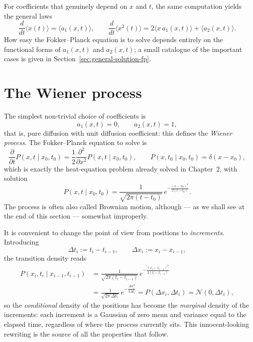 For coefficients that genuinely depend on $x$ and $t$, the same computation yields the general laws
\begin{equation}
\frac{d}{dt}\langle x(t)\rangle = \langle a_1(x,t)\rangle,\qquad
\frac{d}{dt}\langle x^2(t)\rangle = 2\langle x\,a_1(x,t)\rangle + \langle a_2(x,t)\rangle.
\end{equation}
How easy the Fokker--Planck equation is to solve depends entirely on the functional forms of $a_1(x,t)$ and $a_2(x,t)$; a small catalogue of the important cases is given in Section~\ref{sec:general-solution-fp}.


\section{The Wiener process}

The simplest non-trivial choice of coefficients is
\begin{equation}
a_1(x,t)=0,\qquad a_2(x,t)=1,
\end{equation}
that is, pure diffusion with unit diffusion coefficient: this defines the \emph{Wiener process}.
The Fokker--Planck equation to solve is
\begin{equation}
\frac{\partial}{\partial t}P(x,t\mid x_0,t_0) = \frac{1}{2}\frac{\partial^2}{\partial x^2}P(x,t\mid x_0,t_0),
\qquad P(x,t_0\mid x_0,t_0)=\delta(x-x_0),
\end{equation}
which is exactly the heat-equation problem already solved in Chapter~2, with solution
\begin{equation}
P(x,t\mid x_0,t_0) = \frac{1}{\sqrt{2\pi(t-t_0)}}\,e^{-\frac{(x-x_0)^2}{2(t-t_0)}}.
\end{equation}
The process is often also called Brownian motion, although --- as we shall see at the end of this section --- somewhat improperly.

It is convenient to change the point of view from positions to \emph{increments}.
Introducing
\begin{equation}
\Delta t_i := t_i - t_{i-1},\qquad \Delta x_i := x_i - x_{i-1},
\end{equation}
the transition density reads
\begin{equation}\begin{split}
P(x_i,t_i\mid x_{i-1},t_{i-1}) &= \frac{1}{\sqrt{2\pi(t_i-t_{i-1})}}\,e^{-\frac{(x_i-x_{i-1})^2}{2(t_i-t_{i-1})}}\\
&= \frac{1}{\sqrt{2\pi\,\Delta t_i}}\,e^{-\frac{\Delta x_i^2}{2\Delta t_i}}
= P(\Delta x_i,\Delta t_i) = \mathcal{N}(0,\Delta t_i),
\end{split}\end{equation}
so the \emph{conditional} density of the positions has become the \emph{marginal} density of the increments: each increment is a Gaussian of zero mean and variance equal to the elapsed time, regardless of where the process currently sits.
This innocent-looking rewriting is the source of all the properties that follow.

